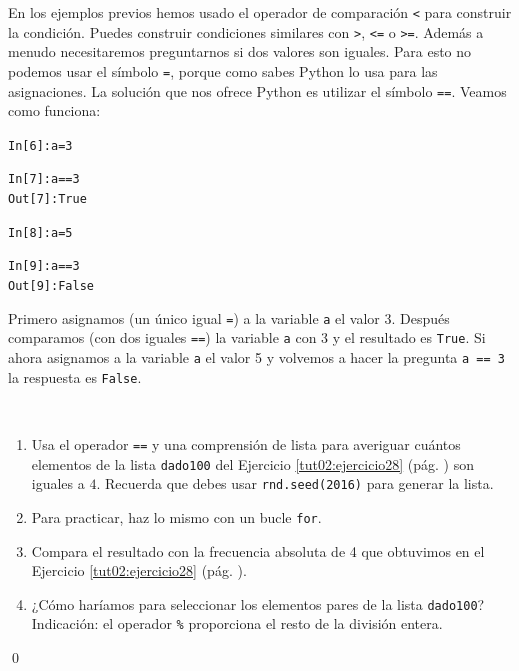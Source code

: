 \documentclass[10pt,a4paper]{article}\usepackage[]{graphicx}\usepackage[]{color}
\makeatletter
\newcommand{\hlnum}[1]{\textcolor[rgb]{0.686,0.059,0.569}{#1}}%
\newcommand{\hlopt}[1]{\textcolor[rgb]{0,0,0}{#1}}%
\newcommand{\hlstd}[1]{\textcolor[rgb]{0.345,0.345,0.345}{#1}}%
\newcommand{\hlkwb}[1]{\textcolor[rgb]{0.69,0.353,0.396}{#1}}%
\newenvironment{kframe}{%
 \def\at@end@of@kframe{}%
 \ifinner\ifhmode%
  \def\at@end@of@kframe{\end{minipage}}%
  \begin{minipage}{\columnwidth}%
 \fi\fi%
 \def\FrameCommand##1{\hskip\@totalleftmargin \hskip-\fboxsep
 \colorbox{shadecolor}{##1}\hskip-\fboxsep
     \hskip-\linewidth \hskip-\@totalleftmargin \hskip\columnwidth}%
 \MakeFramed {\advance\hsize-\width
   \@totalleftmargin\z@ \linewidth\hsize
   \@setminipage}}%
 {\par\unskip\endMakeFramed%
 \at@end@of@kframe}
\newenvironment{knitrout}{}{} %
\makeatother
\begin{document}

En los ejemplos previos hemos usado el operador de comparación {\tt <} para construir la condición. Puedes construir condiciones similares con {\tt >}, {\tt <=} o {\tt >=}. Además a menudo necesitaremos preguntarnos si dos valores son iguales. Para esto no podemos usar el símbolo {\tt =}, porque como sabes Python lo usa para las asignaciones. La solución que nos ofrece Python es utilizar el símbolo {\tt ==}. Veamos como funciona:
\begin{knitrout}
\color{fgcolor}\begin{kframe}
\begin{alltt}
\hlstd{In [}\hlnum{6}\hlstd{]}\hlopt{:} \hlstd{a} \hlkwb{=} \hlnum{3}

\hlstd{In [}\hlnum{7}\hlstd{]}\hlopt{:} \hlstd{a} \hlopt{==} \hlnum{3}
\hlstd{Out[}\hlnum{7}\hlstd{]}\hlopt{:} \hlstd{True}

\hlstd{In [}\hlnum{8}\hlstd{]}\hlopt{:} \hlstd{a} \hlkwb{=} \hlnum{5}

\hlstd{In [}\hlnum{9}\hlstd{]}\hlopt{:} \hlstd{a} \hlopt{==} \hlnum{3}
\hlstd{Out[}\hlnum{9}\hlstd{]}\hlopt{:} \hlstd{False}
\end{alltt}
\end{kframe}
\end{knitrout}
Primero asignamos (un único igual {\tt =}) a la variable {\tt a} el valor 3. Después comparamos (con dos iguales {\tt ==}) la variable {\tt a} con 3 y el resultado es {\tt True}. Si ahora asignamos a la variable {\tt a} el valor 5 y volvemos a hacer la pregunta {\tt a == 3} la respuesta es {\tt False}.

\begin{ejercicio}
\label{tut02:ejercicio30}
\quad\\
\begin{enumerate}
\item Usa el operador {\tt ==} y una comprensión de lista para averiguar cuántos elementos de la lista {\tt dado100} del Ejercicio \ref{tut02:ejercicio28} (pág. \pageref{tut02:ejercicio28}) son iguales a $4$. Recuerda que debes usar {\tt rnd.seed(2016)} para generar la lista.
\item Para practicar, haz lo mismo con un bucle {\tt for}.
\item Compara el resultado con la frecuencia absoluta de 4 que obtuvimos en el Ejercicio \ref{tut02:ejercicio28} (pág. \pageref{tut02:ejercicio28}).
\item ¿Cómo haríamos para seleccionar los elementos pares de la lista {\tt dado100}? Indicación: el operador \verb&%&
proporciona el resto de la división entera.
\end{enumerate}
\qed
\end{ejercicio}
\end{document}
